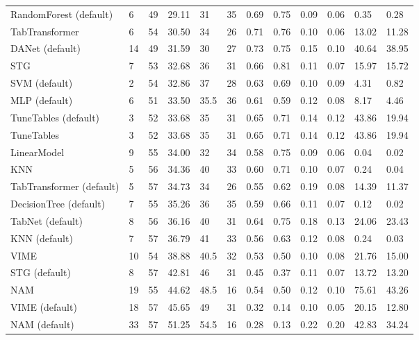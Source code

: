\begin{tabular}{lllllrllllll}
RandomForest (default) & 6 & 49 & 29.11 & 31 & 35 & 0.69 & 0.75 & 0.09 & 0.06 & 0.35 & 0.28 \\
TabTransformer & 6 & 54 & 30.50 & 34 & 26 & 0.71 & 0.76 & 0.10 & 0.06 & 13.02 & 11.28 \\
DANet (default) & 14 & 49 & 31.59 & 30 & 27 & 0.73 & 0.75 & 0.15 & 0.10 & 40.64 & 38.95 \\
STG & 7 & 53 & 32.68 & 36 & 31 & 0.66 & 0.81 & 0.11 & 0.07 & 15.97 & 15.72 \\
SVM (default) & 2 & 54 & 32.86 & 37 & 28 & 0.63 & 0.69 & 0.10 & 0.09 & 4.31 & 0.82 \\
MLP (default) & 6 & 51 & 33.50 & 35.5 & 36 & 0.61 & 0.59 & 0.12 & 0.08 & 8.17 & 4.46 \\
TuneTables (default) & 3 & 52 & 33.68 & 35 & 31 & 0.65 & 0.71 & 0.14 & 0.12 & 43.86 & 19.94 \\
TuneTables & 3 & 52 & 33.68 & 35 & 31 & 0.65 & 0.71 & 0.14 & 0.12 & 43.86 & 19.94 \\
LinearModel & 9 & 55 & 34.00 & 32 & 34 & 0.58 & 0.75 & 0.09 & 0.06 & 0.04 & 0.02 \\
KNN & 5 & 56 & 34.36 & 40 & 33 & 0.60 & 0.71 & 0.10 & 0.07 & 0.24 & 0.04 \\
TabTransformer (default) & 5 & 57 & 34.73 & 34 & 26 & 0.55 & 0.62 & 0.19 & 0.08 & 14.39 & 11.37 \\
DecisionTree (default) & 7 & 55 & 35.26 & 36 & 35 & 0.59 & 0.66 & 0.11 & 0.07 & 0.12 & 0.02 \\
TabNet (default) & 8 & 56 & 36.16 & 40 & 31 & 0.64 & 0.75 & 0.18 & 0.13 & 24.06 & 23.43 \\
KNN (default) & 7 & 57 & 36.79 & 41 & 33 & 0.56 & 0.63 & 0.12 & 0.08 & 0.24 & 0.03 \\
VIME & 10 & 54 & 38.88 & 40.5 & 32 & 0.53 & 0.50 & 0.10 & 0.08 & 21.76 & 15.00 \\
STG (default) & 8 & 57 & 42.81 & 46 & 31 & 0.45 & 0.37 & 0.11 & 0.07 & 13.72 & 13.20 \\
NAM & 19 & 55 & 44.62 & 48.5 & 16 & 0.54 & 0.50 & 0.12 & 0.10 & 75.61 & 43.26 \\
VIME (default) & 18 & 57 & 45.65 & 49 & 31 & 0.32 & 0.14 & 0.10 & 0.05 & 20.15 & 12.80 \\
NAM (default) & 33 & 57 & 51.25 & 54.5 & 16 & 0.28 & 0.13 & 0.22 & 0.20 & 42.83 & 34.24 \\
\bottomrule
\end{tabular}
